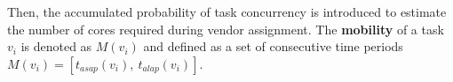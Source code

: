 \documentclass[10pt,journal]{IEEEtran}
\begin{document}






Then, the accumulated probability of task concurrency is introduced to estimate the number of cores required during vendor assignment. The \textbf{mobility} of a task $v_{i}$ is denoted as $M(v_i)$ and defined as a set of consecutive time periods $M(v_{i})=[t_{asap}(v_{i}),~t_{alap}(v_{i})]$.%
\end{document}
